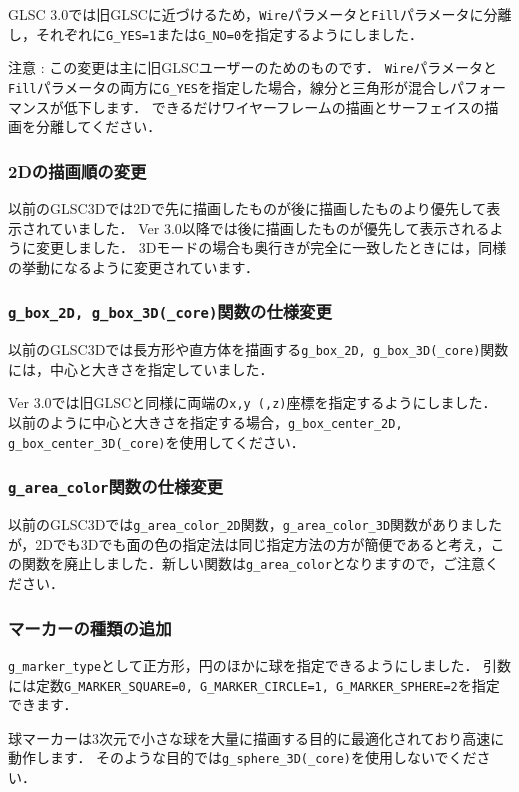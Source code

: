 \documentclass[platex,a4paper,12pt]{jsarticle}%
\begin{document}
GLSC 3.0では旧GLSCに近づけるため，\verb|Wire|パラメータと\verb|Fill|パラメータに分離し，それぞれに\verb|G_YES=1|または\verb|G_NO=0|を指定するようにしました．

注意 : この変更は主に旧GLSCユーザーのためのものです．
\verb|Wire|パラメータと\verb|Fill|パラメータの両方に\verb|G_YES|を指定した場合，線分と三角形が混合しパフォーマンスが低下します．
できるだけワイヤーフレームの描画とサーフェイスの描画を分離してください．

\newpage
\subsubsection{2Dの描画順の変更}
以前のGLSC3Dでは2Dで先に描画したものが後に描画したものより優先して表示されていました．
Ver 3.0以降では後に描画したものが優先して表示されるように変更しました．
3Dモードの場合も奥行きが完全に一致したときには，同様の挙動になるように変更されています．

\subsubsection{\texttt{g\_box\_2D, g\_box\_3D(\_core)}関数の仕様変更}
以前のGLSC3Dでは長方形や直方体を描画する\verb|g_box_2D, g_box_3D(_core)|関数には，中心と大きさを指定していました．

Ver 3.0では旧GLSCと同様に両端の\verb|x,y (,z)|座標を指定するようにしました．
以前のように中心と大きさを指定する場合，\verb|g_box_center_2D, g_box_center_3D(_core)|を使用してください．

\subsubsection{\texttt{g\_area\_color}関数の仕様変更}
以前のGLSC3Dでは\texttt{g\_area\_color\_2D}関数，\texttt{g\_area\_color\_3D}関数がありましたが，2Dでも3Dでも面の色の指定法は同じ指定方法の方が簡便であると考え，この関数を廃止しました．新しい関数は\texttt{g\_area\_color}となりますので，ご注意ください．

\subsubsection{マーカーの種類の追加}
\verb|g_marker_type|として正方形，円のほかに球を指定できるようにしました．
引数には定数\verb|G_MARKER_SQUARE=0, G_MARKER_CIRCLE=1, G_MARKER_SPHERE=2|を指定できます．

球マーカーは3次元で小さな球を大量に描画する目的に最適化されており高速に動作します．
そのような目的では\verb|g_sphere_3D(_core)|を使用しないでください．
\end{document}
